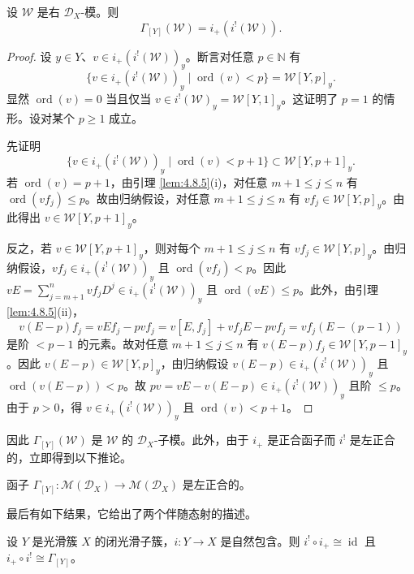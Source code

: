\begin{lemma}\label{lem:4.8.8}
设 $\mathcal{W}$ 是右 $\mathcal{D}_X$-模。则
$$\Gamma_{[Y]}(\mathcal{W})=i_+(i^!(\mathcal{W})).$$
\end{lemma}

\begin{proof}
设 $y\in Y$、$v\in i_+(i^!(\mathcal{W}))_y$。断言对任意 $p\in\mathbb{N}$ 有
$$\{v\in i_+(i^!(\mathcal{W}))_y\mid\operatorname{ord}(v)<p\}=\mathcal{W}[Y,p]_y.$$
显然 $\operatorname{ord}(v)=0$ 当且仅当 $v\in i^!(\mathcal{W})_y=\mathcal{W}[Y,1]_y$。这证明了 $p=1$ 的情形。设对某个 $p\ge1$ 成立。

先证明
$$\{v\in i_+(i^!(\mathcal{W}))_y\mid\operatorname{ord}(v)<p+1\}\subset\mathcal{W}[Y,p+1]_y.$$
若 $\operatorname{ord}(v)=p+1$，由引理 \ref{lem:4.8.5}(i)，对任意 $m+1\le j\le n$ 有 $\operatorname{ord}(vf_j)\le p$。故由归纳假设，对任意 $m+1\le j\le n$ 有 $vf_j\in\mathcal{W}[Y,p]_y$。由此得出 $v\in\mathcal{W}[Y,p+1]_y$。

反之，若 $v\in\mathcal{W}[Y,p+1]_y$，则对每个 $m+1\le j\le n$ 有 $vf_j\in\mathcal{W}[Y,p]_y$。由归纳假设，$vf_j\in i_+(i^!(\mathcal{W}))_y$ 且 $\operatorname{ord}(vf_j)<p$。因此
$vE=\sum_{j=m+1}^nvf_jD^j\in i_+(i^!(\mathcal{W}))_y$ 且 $\operatorname{ord}(vE)\le p$。此外，由引理 \ref{lem:4.8.5}(ii)，
$$v(E-p)f_j=vEf_j-pvf_j=v[E,f_j]+vf_jE-pvf_j=vf_j(E-(p-1))$$
是阶 $<p-1$ 的元素。故对任意 $m+1\le j\le n$ 有 $v(E-p)f_j\in\mathcal{W}[Y,p-1]_y$。因此 $v(E-p)\in\mathcal{W}[Y,p]_y$，由归纳假设 $v(E-p)\in i_+(i^!(\mathcal{W}))_y$ 且 $\operatorname{ord}(v(E-p))<p$。故 $pv=vE-v(E-p)\in i_+(i^!(\mathcal{W}))_y$ 且阶 $\le p$。由于 $p>0$，得 $v\in i_+(i^!(\mathcal{W}))_y$ 且 $\operatorname{ord}(v)<p+1$。
\end{proof}

因此 $\Gamma_{[Y]}(\mathcal{W})$ 是 $\mathcal{W}$ 的 $\mathcal{D}_X$-子模。此外，由于 $i_+$ 是正合函子而 $i^!$ 是左正合的，立即得到以下推论。

\begin{proposition}\label{prop:4.8.9}
函子 $\Gamma_{[Y]}:\mathcal{M}(\mathcal{D}_X)\to\mathcal{M}(\mathcal{D}_X)$ 是左正合的。
\end{proposition}

最后有如下结果，它给出了两个伴随态射的描述。

\begin{theorem}\label{thm:4.8.10}
设 $Y$ 是光滑簇 $X$ 的闭光滑子簇，$i:Y\to X$ 是自然包含。则
$i^!\circ i_+\cong\operatorname{id}$ 且 $i_+\circ i^!\cong\Gamma_{[Y]}$。
\end{theorem}

